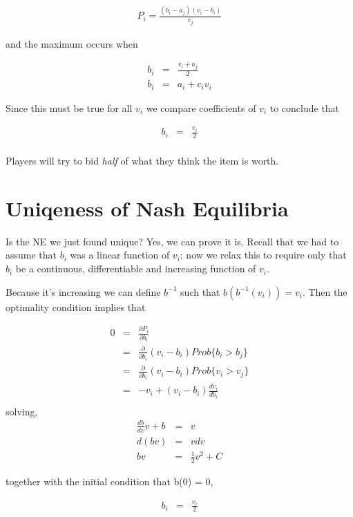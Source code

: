 \documentclass{article}
\begin{document}
\begin{eqnarray*}
P_i = \frac{(b_i - a_j)(v_i - b_i)}{c_j}
\end{eqnarray*}

and the maximum occurs when

\begin{eqnarray*}
b_i &=& \frac{v_i + a_j}{2} \\
b_i &=& a_i + c_i v_i
\end{eqnarray*}

Since this must be true for all $v_i$ we compare coefficients of $v_i$ to conclude that

\begin{eqnarray*}
b_i &=& \frac{v_i}{2} \\
\end{eqnarray*}

Players will try to bid \emph{half} of what they think the item is worth.

\section{Uniqeness of Nash Equilibria}

Is the NE we just found unique? Yes, we can prove it is. Recall that we had to assume that $b_i$ was a linear function of $v_i$; now we relax this to require only that $b_i$ be a continuous, differentiable and increasing function of $v_i$.

Because it's increasing we can define $b^{-1}$ such that $b(b^{-1}(v_i)) = v_i$. Then the optimality condition implies that

\begin{eqnarray*}
0 &=& \frac{\partial P_i}{\partial b_i} \\
&=& \frac{\partial }{\partial b_i} (v_i - b_i) Prob\{b_i > b_j\} \\
&=& \frac{\partial }{\partial b_i} (v_i - b_i) Prob\{v_i > v_j\} \\
&=& -v_i + (v_i - b_i)\frac{d v_i}{d b_i} \\
\end{eqnarray*}
solving,
\begin{eqnarray*}
\frac{d b}{d v} v + b &=& v \\
d(bv) &=& v dv \\
bv &=& \frac{1}{2} v^2 + C
\end{eqnarray*}

together with the initial condition that b(0) = 0,

\begin{eqnarray*}
b_i &=& \frac{v_i}{2} \\
\end{eqnarray*}
\end{document}
